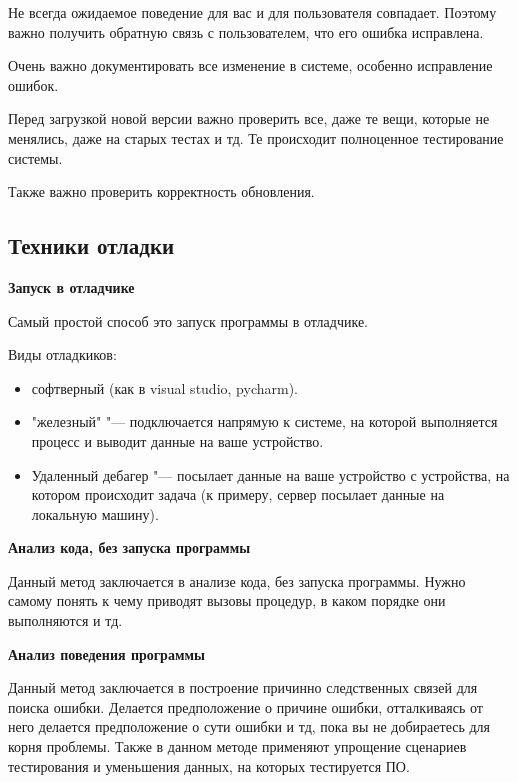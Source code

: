 \documentclass[bachelor, och, pract]{SCWorks}
\theoremstyle{remark}
\newtheorem{comment}{Замечание}
\begin{document}
    Не всегда ожидаемое поведение для вас и для пользователя совпадает. Поэтому важно получить обратную связь с пользователем, что его ошибка исправлена.

    Очень важно документировать все изменение в системе, особенно исправление ошибок.
    
    Перед загрузкой новой версии важно проверить все, даже те вещи, которые не менялись, даже на старых тестах и тд. Те происходит полноценное тестирование системы. 

    Также важно проверить корректность обновления.

    

    \subsection{Техники отладки}
    
    \hfill \break
    \textbf{Запуск в отладчике}
    
    Самый простой способ это запуск программы в отладчике.
    
    Виды отладкиков:
    \begin{itemize}[label=$\bullet$]
        \item софтверный (как в visual studio, pycharm).
        \item "железный" "--- подключается напрямую к системе, на которой выполняется процесс и выводит данные на ваше устройство.
        \item Удаленный дебагер "--- посылает данные на ваше устройство с устройства, на котором происходит задача (к примеру, сервер посылает данные на локальную машину).
    \end{itemize}

    \hfill \break
    \textbf{Анализ кода, без запуска программы}

    Данный метод заключается в анализе кода, без запуска программы. Нужно самому понять к чему приводят вызовы процедур, в каком порядке они выполняются и тд.
   
    \hfill \break
    \textbf{Анализ поведения программы}

    Данный метод заключается в построение причинно следственных связей для поиска ошибки. Делается предположение о причине ошибки, отталкиваясь от него делается предположение о сути ошибки и тд, пока вы не добираетесь для корня проблемы. Также в данном методе применяют упрощение сценариев тестирования и уменьшения данных, на которых тестируется ПО.
\end{document}
